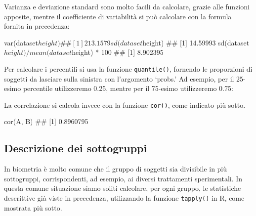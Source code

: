 \documentclass[a4paper,12pt,oneside]{book}
\newenvironment{Shaded}{\begin{snugshade}}{\end{snugshade}}
\newcommand{\DecValTok}[1]{#1}
\newcommand{\FloatTok}[1]{#1}
\newcommand{\SpecialCharTok}[1]{#1}
\newcommand{\DocumentationTok}[1]{#1}
\newcommand{\FunctionTok}[1]{#1}
\newcommand{\AttributeTok}[1]{#1}
\newcommand{\NormalTok}[1]{#1}
\begin{document}
Varianza e deviazione standard sono molto facili da calcolare, grazie alle funzioni apposite, mentre il coefficiente di variabilità si può calcolare con la formula fornita in precedenza:

\begin{Shaded}
\begin{Highlighting}[]
\FunctionTok{var}\NormalTok{(dataset}\SpecialCharTok{$}\NormalTok{height)}
\DocumentationTok{\#\# [1] 213.1579}
\FunctionTok{sd}\NormalTok{(dataset}\SpecialCharTok{$}\NormalTok{height)}
\DocumentationTok{\#\# [1] 14.59993}
\FunctionTok{sd}\NormalTok{(dataset}\SpecialCharTok{$}\NormalTok{height)}\SpecialCharTok{/}\FunctionTok{mean}\NormalTok{(dataset}\SpecialCharTok{$}\NormalTok{height) }\SpecialCharTok{*} \DecValTok{100}
\DocumentationTok{\#\# [1] 8.902395}
\end{Highlighting}
\end{Shaded}

Per calcolare i percentili si usa la funzione \texttt{quantile()}, fornendo le proporzioni di soggetti da lasciare sulla sinistra con l'argomento `probs.' Ad esempio, per il 25-esimo percentile utilizzeremo 0.25, mentre per il 75-esimo utilizzeremo 0.75:

\begin{Shaded}
\end{Shaded}

La correlazione si calcola invece con la funzione \texttt{cor()}, come indicato più sotto.

\begin{Shaded}
\begin{Highlighting}[]
\FunctionTok{cor}\NormalTok{(A, B)}
\DocumentationTok{\#\# [1] 0.8960795}
\end{Highlighting}
\end{Shaded}

\hypertarget{descrizione-dei-sottogruppi}{%
\subsection{Descrizione dei sottogruppi}\label{descrizione-dei-sottogruppi}}

In biometria è molto comune che il gruppo di soggetti sia divisibile in più sottogruppi, corrispondenti, ad esempio, ai diversi trattamenti sperimentali. In questa comune situazione siamo soliti calcolare, per ogni gruppo, le statistiche descrittive già viste in precedenza, utilizzando la funzione \texttt{tapply()} in R, come mostrata più sotto.
\end{document}
